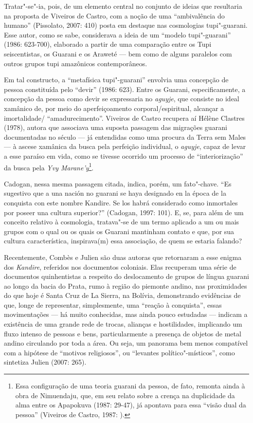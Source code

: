 Tratar"-se"-ia, pois, de um elemento central no conjunto de ideias que
resultaria na proposta de Viveiros de Castro, com a noção de uma
``ambivalência do humano'' (Pissolato, 2007: 410) posta em destaque nas
cosmologias tupi"-guarani. Esse autor, como se sabe, considerava a ideia
de um ``modelo tupi"-guarani'' (1986: 623-700), elaborado a partir de uma
comparação entre os Tupi seiscentistas, os Guarani e os Araweté --- bem
como de alguns paralelos com outros grupos tupi amazônicos
contemporâneos.

Em tal constructo, a ``metafísica tupi"-guarani'' envolvia uma concepção de
pessoa constituída pelo ``devir'' (1986: 623). Entre os Guarani,
especificamente, a concepção da pessoa como devir se expressaria no
\emph{aguyje}, que consiste no ideal xamânico de, por meio do aperfeiçoamento
corporal/espiritual, alcançar a imortalidade/ ``amadurecimento''.
Viveiros de Castro recupera aí Hélène Clastres (1978), autora que
associava uma suposta passagem das migrações guarani documentadas no
século  --- já entendidas como uma procura da Terra sem Males --- à
ascese xamânica da busca pela perfeição individual, o \emph{aguyje}, capaz de
levar a esse paraíso em vida, como se tivesse ocorrido um processo de
``interiorização'' da busca pela \emph{Yvy Marane’y}\footnote{Essa configuração
de uma teoria guarani da pessoa, de fato, remonta ainda à obra de
Nimuendaju, que, em seu relato sobre a crença na duplicidade da alma
entre os Apapokuva (1987: 29-47), já apontava para essa ``visão dual da
pessoa'' (Viveiros de Castro, 1987: ).}.

Cadogan, nessa mesma passagem citada, indica, porém, um fato"-chave. ``Es
sugestivo que a una nación no guarani se haya designado en la época de
la conquista con este nombre Kandire. Se los habrá considerado como
inmortales por poseer una cultura superior?'' (Cadogan, 1997: 101). E,
se, para além de um conceito relativo à cosmologia, tratava"-se de um
termo aplicado a um ou mais grupos com o qual ou os quais os Guarani
mantinham contato e que, por sua cultura característica, inspirava(m)
essa associação, de quem se estaria falando?

Recentemente, Combès e Julien são duas autoras que retornaram a esse
enigma dos \emph{Kandire}, referidos nos documentos coloniais. Elas recuperam
uma série de documentos quinhentistas a respeito do deslocamento de
grupos de língua guarani ao longo da bacia do Prata, rumo à região do
piemonte andino, nas proximidades do que hoje é Santa Cruz de La
Sierra, na Bolívia, demonstrando evidências de que, longe de
representar, simplesmente, uma ``reação à conquista'', essas
movimentações --- há muito conhecidas, mas ainda pouco estudadas ---
indicam a existência de uma grande rede de trocas, alianças e
hostilidades, implicando um fluxo intenso de pessoas e bens,
particularmente a presença de objetos de metal andino circulando por
toda a área. Ou seja, um panorama bem menos compatível com a hipótese
de ``motivos religiosos'', ou ``levantes político"-místicos'', como
sintetiza Julien (2007: 265).

